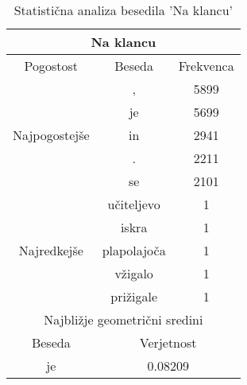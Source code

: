 \documentclass[border=10pt]{standalone}
\begin{document}
\begin{table}[H]
\caption{Statistična analiza besedila 'Na klancu'} \label{tab_na_klancu}
\begin{center}
\begin{tabular}{|c|c|c|}
    \hline
    \multicolumn{3}{|c|}{Na klancu} \\
    \hline
    Pogostost & Beseda & Frekvenca\\
    \hline
    \multirow{5}{*}{Najpogostejše} & , & 5899\\
                         & je   & 5699 \\
                         & in   & 2941 \\
                         & .   & 2211 \\
                         & se   & 2101 \\
    \hline
    \multirow{5}{*}{Najredkejše} & učiteljevo & 1 \\
                         & iskra   & 1 \\
                         & plapolajoča   & 1 \\
                         & vžigalo   & 1 \\
                         & prižigale  & 1 \\
    \hline
    \multicolumn{3}{|c|}{Najbližje geometrični sredini}\\
    \hline
    Beseda & \multicolumn{2}{|c|}{Verjetnost} \\
    \hline
    je & \multicolumn{2}{|c|}{0.08209} \\
    \hline
\end{tabular}
\end{center}
\end{table}
\end{document}
